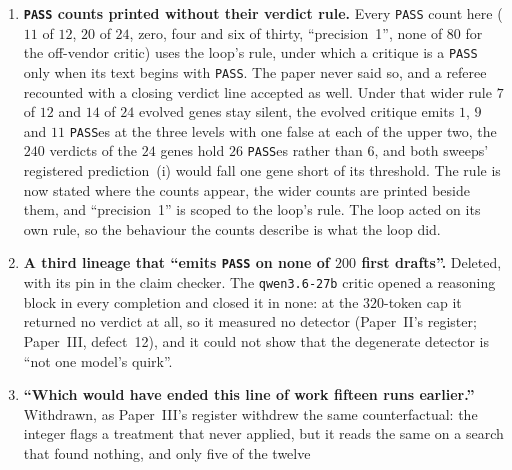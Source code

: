 \documentclass[11pt]{article}
\begin{document}
\begin{enumerate}
    it. The Goodhart framing (``it loses because it succeeded at optimizing a training signal that
    rewards refusing to accept'', ``improving the proxy is what moves the true objective the wrong
    way'') implied the cost entry~1 withdraws, while never-accepting is close to the right policy at
    that base rate. \texttt{fig-effects} plotted the swing at the cross-run multiple, about
    $2.5\sigma$, which \S\ref{sec:p0} replaces with the per-draw $1.55\sigma$; the marker is gone.
    And \texttt{fig-p0} joined the three levels with a line, which drew a curve through $p_0$; the
    line is gone and the eight other $L_1$ runs stand beside $L_1$. Entries~1, 29 and~45 recorded
    the conditional reading as what survived; it does not.
  \item \textbf{\texttt{PASS} counts printed without their verdict rule.} Every \texttt{PASS} count
    here ($11$ of $12$, $20$ of $24$, zero, four and six of thirty, ``precision~1'', none of $80$
    for the off-vendor critic) uses the loop's rule, under which a critique is a \texttt{PASS}
    only when its text begins with \texttt{PASS}. The paper never said so, and a referee recounted
    with a closing verdict line accepted as well. Under that wider rule $7$ of $12$ and $14$ of
    $24$ evolved genes stay silent, the evolved critique emits $1$, $9$ and $11$ \texttt{PASS}es at
    the three levels with one false at each of the upper two, the $240$ verdicts of the $24$
    genes hold $26$ \texttt{PASS}es rather than $6$, and both sweeps' registered prediction~(i)
    would fall one gene short of its threshold. The rule is now stated where the counts appear,
    the wider counts are printed beside them, and ``precision~1'' is scoped to the loop's rule.
    The loop acted on its own rule, so the behaviour the counts describe is what the loop did.
  \item \textbf{A third lineage that ``emits \texttt{PASS} on none of $200$ first drafts''.}
    Deleted, with its pin in the claim checker. The \texttt{qwen3.6-27b} critic opened a
    reasoning block in every completion and closed it in none: at the $320$-token cap it returned
    no verdict at all, so it measured no detector (Paper~II's register; Paper~III, defect~12), and
    it could not show that the degenerate detector is ``not one model's quirk''.
  \item \textbf{``Which would have ended this line of work fifteen runs earlier.''} Withdrawn, as
    Paper~III's register withdrew the same counterfactual: the integer flags a treatment that never
    applied, but it reads the same on a search that found nothing, and only five of the twelve

\end{enumerate}
\end{document}
